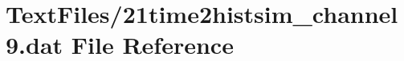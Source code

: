 \hypertarget{21time2histsim__channel9_8dat}{}\section{Text\+Files/21time2histsim\+\_\+channel9.dat File Reference}
\label{21time2histsim__channel9_8dat}
